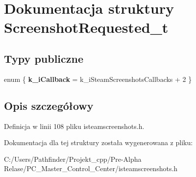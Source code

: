 \hypertarget{struct_screenshot_requested__t}{}\section{Dokumentacja struktury Screenshot\+Requested\+\_\+t}
\label{struct_screenshot_requested__t}
\subsection*{Typy publiczne}
\begin{DoxyCompactItemize}
\item 
\mbox{\label{struct_screenshot_requested__t_aafec8a6d42d71c903f559f7cd7f80907}} 
enum \{ {\bfseries k\+\_\+i\+Callback} = k\+\_\+i\+Steam\+Screenshots\+Callbacks + 2
 \}
\end{DoxyCompactItemize}


\subsection{Opis szczegółowy}


Definicja w linii 108 pliku isteamscreenshots.\+h.



Dokumentacja dla tej struktury została wygenerowana z pliku\+:\begin{DoxyCompactItemize}
\item 
C\+:/\+Users/\+Pathfinder/\+Projekt\+\_\+cpp/\+Pre-\/\+Alpha Relase/\+P\+C\+\_\+\+Master\+\_\+\+Control\+\_\+\+Center/isteamscreenshots.\+h\end{DoxyCompactItemize}
